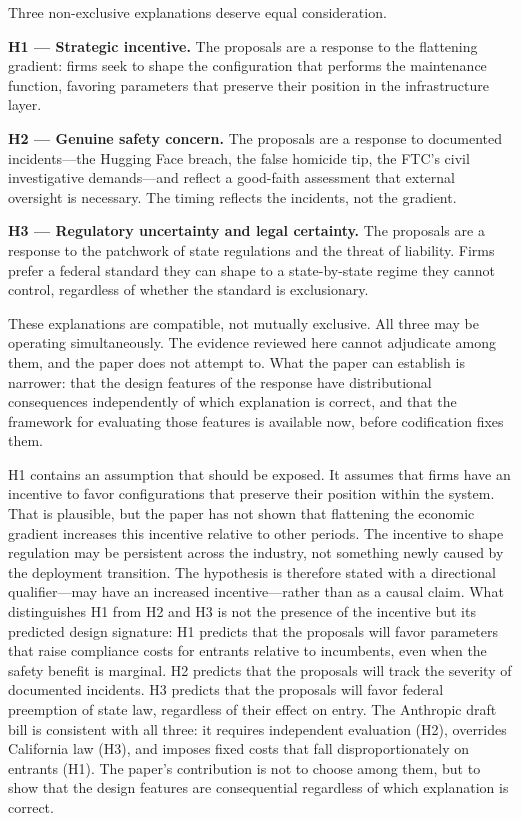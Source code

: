 Three non-exclusive explanations deserve equal consideration.

\textbf{H1 --- Strategic incentive.} The proposals are a response to the flattening gradient: firms seek to shape the configuration that performs the maintenance function, favoring parameters that preserve their position in the infrastructure layer.

\textbf{H2 --- Genuine safety concern.} The proposals are a response to documented incidents---the Hugging Face breach, the false homicide tip, the FTC's civil investigative demands---and reflect a good-faith assessment that external oversight is necessary. The timing reflects the incidents, not the gradient.

\textbf{H3 --- Regulatory uncertainty and legal certainty.} The proposals are a response to the patchwork of state regulations and the threat of liability. Firms prefer a federal standard they can shape to a state-by-state regime they cannot control, regardless of whether the standard is exclusionary.

These explanations are compatible, not mutually exclusive. All three may be operating simultaneously. The evidence reviewed here cannot adjudicate among them, and the paper does not attempt to. What the paper can establish is narrower: that the design features of the response have distributional consequences independently of which explanation is correct, and that the framework for evaluating those features is available now, before codification fixes them.

H1 contains an assumption that should be exposed. It assumes that firms have an incentive to favor configurations that preserve their position within the system. That is plausible, but the paper has not shown that flattening the economic gradient increases this incentive relative to other periods. The incentive to shape regulation may be persistent across the industry, not something newly caused by the deployment transition. The hypothesis is therefore stated with a directional qualifier---may have an increased incentive---rather than as a causal claim. What distinguishes H1 from H2 and H3 is not the presence of the incentive but its predicted design signature: H1 predicts that the proposals will favor parameters that raise compliance costs for entrants relative to incumbents, even when the safety benefit is marginal. H2 predicts that the proposals will track the severity of documented incidents. H3 predicts that the proposals will favor federal preemption of state law, regardless of their effect on entry. The Anthropic draft bill is consistent with all three: it requires independent evaluation (H2), overrides California law (H3), and imposes fixed costs that fall disproportionately on entrants (H1). The paper's contribution is not to choose among them, but to show that the design features are consequential regardless of which explanation is correct.

